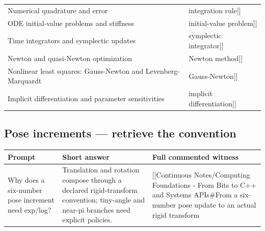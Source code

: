 {\begin{longtable}[]{@{}
  >{\raggedright\arraybackslash}p{}
  >{\raggedright\arraybackslash}p{}@{}}
{[}{[}Numerical quadrature and error & integration rule{]}{]} \\
{[}{[}ODE initial-value problems and stiffness & initial-value problem{]}{]} \\
{[}{[}Time integrators and symplectic updates & symplectic integrator{]}{]} \\
{[}{[}Newton and quasi-Newton optimization & Newton method{]}{]} \\
{[}{[}Nonlinear least squares: Gauss-Newton and Levenberg-Marquardt & Gauss-Newton{]}{]} \\
{[}{[}Implicit differentiation and parameter sensitivities & implicit differentiation{]}{]} \\
\end{longtable}
}

\subsection{Pose increments --- retrieve the convention}\label{pose-increments-retrieve-the-convention}

{\def\LTcaptype{none} %
\begin{longtable}[]{@{}
  >{\raggedright\arraybackslash}p{}
  >{\raggedright\arraybackslash}p{}
  >{\raggedright\arraybackslash}p{}@{}}
\toprule\noalign{}
\begin{minipage}[b]{\linewidth}\raggedright
Prompt
\end{minipage} & \begin{minipage}[b]{\linewidth}\raggedright
Short answer
\end{minipage} & \begin{minipage}[b]{\linewidth}\raggedright
Full commented witness
\end{minipage} \\
\midrule\noalign{}
\endhead
\bottomrule\noalign{}
\endlastfoot
Why does a six-number pose increment need exp/log? & Translation and rotation compose through a declared rigid-transform convention; tiny-angle and near-pi branches need explicit policies. & {[}{[}Continuous Notes/Computing Foundations - From Bits to C++ and Systems APIs\#From a six-number pose update to an actual rigid transform \\
\end{longtable}
}
